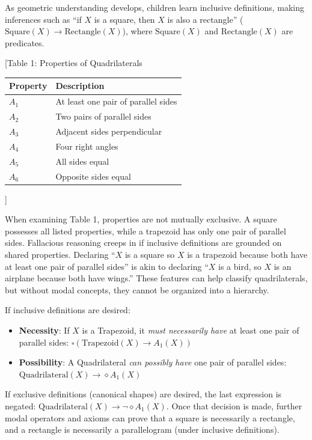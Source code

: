 \documentclass[12pt]{book}
\begin{document}
As geometric understanding develops, children learn inclusive definitions, making inferences such as ``if \(X\) is a square, then \(X\) is also a rectangle'' (\(\text{Square}(X) \rightarrow \text{Rectangle}(X)\)), where \(\text{Square}(X)\) and \(\text{Rectangle}(X)\) are predicates.

{[}Table 1: Properties of Quadrilaterals

\begin{longtable}[]{@{}ll@{}}
\toprule\noalign{}
Property & Description \\
\midrule\noalign{}
\endhead
\bottomrule\noalign{}
\endlastfoot
\(A_1\) & At least one pair of parallel sides \\
\(A_2\) & Two pairs of parallel sides \\
\(A_3\) & Adjacent sides perpendicular \\
\(A_4\) & Four right angles \\
\(A_5\) & All sides equal \\
\(A_6\) & Opposite sides equal \\
\end{longtable}

{]}

When examining Table 1, properties are not mutually exclusive. A square possesses all listed properties, while a trapezoid has only one pair of parallel sides. Fallacious reasoning creeps in if inclusive definitions are grounded on shared properties. Declaring ``\(X\) is a square so \(X\) is a trapezoid because both have at least one pair of parallel sides'' is akin to declaring ``\(X\) is a bird, so \(X\) is an airplane because both have wings.'' These features can help classify quadrilaterals, but without modal concepts, they cannot be organized into a hierarchy.

If inclusive definitions are desired:

\begin{itemize}

\item
  \textbf{Necessity}: If \(X\) is a Trapezoid, it \emph{must necessarily have} at least one pair of parallel sides: \(\square(\text{Trapezoid}(X) \rightarrow A_1(X))\)
\item
  \textbf{Possibility}: A Quadrilateral \emph{can possibly have} one pair of parallel sides: \(\text{Quadrilateral}(X) \rightarrow \diamond A_1(X)\)
\end{itemize}

If exclusive definitions (canonical shapes) are desired, the last expression is negated: \(\text{Quadrilateral}(X) \rightarrow \neg\diamond A_1(X)\). Once that decision is made, further modal operators and axioms \parencite[141-175]{Brandom2008} can prove that a square is necessarily a rectangle, and a rectangle is necessarily a parallelogram (under inclusive definitions).
\end{document}
